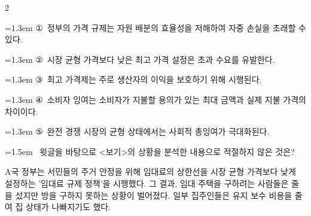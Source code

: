 \documentclass[10pt, a4paper]{article}
\begin{document}
\begin{multicols}{2}
\begin{minipage}{\columnwidth}
\vspace{0.5mm}
{\hangindent=1.3em  \noindent\hspace{0.3em}①~정부의 가격 규제는 자원 배분의 효율성을 저해하여 자중 손실을 초래할 수 있다.\par}
{\hangindent=1.3em  \noindent\hspace{0.3em}②~시장 균형 가격보다 낮은 최고 가격 설정은 초과 수요를 유발한다.\par}
{\hangindent=1.3em  \noindent\hspace{0.3em}③~최고 가격제는 주로 생산자의 이익을 보호하기 위해 시행된다.\par}
{\hangindent=1.3em  \noindent\hspace{0.3em}④~소비자 잉여는 소비자가 지불할 용의가 있는 최대 금액과 실제 지불 가격의 차이이다.\par}
{\hangindent=1.3em  \noindent\hspace{0.3em}⑤~완전 경쟁 시장의 균형 상태에서는 사회적 총잉여가 극대화된다.\par}
\vspace{4mm}
\end{minipage}
\par

\noindent\begin{minipage}{\columnwidth}
\vspace{2mm}
{\hangindent=1.5em  ~윗글을 바탕으로 <보기>의 상황을 분석한 내용으로 적절하지 않은 것은?\par}

\vspace{1mm}
\begin{boxibox}
A국 정부는 서민들의 주거 안정을 위해 임대료의 상한선을 시장 균형 가격보다 낮게 설정하는 '임대료 규제 정책'을 시행했다. 그 결과, 임대 주택을 구하려는 사람들은 줄을 섰지만 방을 구하지 못하는 상황이 벌어졌다. 일부 집주인들은 유지 보수 비용을 줄여 집 상태가 나빠지기도 했다. \\
\end{boxibox}
\vspace{1mm}


\end{minipage}
\end{multicols}
\end{document}
